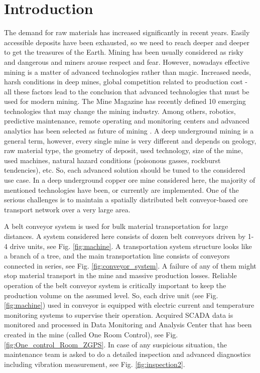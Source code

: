 \documentclass[3p,times,12pt]{elsarticle}
\begin{document}
\section{Introduction}
The demand for raw materials has increased significantly in recent years. Easily accessible deposits have been exhausted, so we need to reach deeper and deeper to get the treasures of the Earth. Mining has been usually considered as risky and dangerous and miners arouse respect and fear. However, nowadays effective mining is a matter of advanced technologies rather than magic. Increased needs, harsh conditions in deep mines, global competition related to production cost - all these factors lead to the conclusion that advanced technologies that must be used for modern mining. 
The Mine Magazine has recently defined 10 emerging technologies that may change the mining industry. Among others, robotics, predictive maintenance, remote operating and monitoring centers and advanced analytics has been selected as future of mining \cite{miningmagazine}. A deep underground mining is a general term, however, every single mine is very different and depends on geology, raw material type, the geometry of deposit, used technology, size of the mine, used machines, natural hazard conditions (poisonous gasses, rockburst tendencies), etc. So, each advanced solution should be tuned to the considered use case. In a deep underground copper ore mine considered here, the majority of mentioned technologies have been, or currently are implemented. One of the serious challenges is to maintain a spatially distributed belt conveyor-based ore transport network over a very large area.

A belt conveyor system is used for bulk material transportation for large distances. A  system considered here consists of dozen belt conveyors driven by 1-4 drive units, see Fig. \ref{fig:machine}. A transportation system structure looks like a branch of a tree, and the main transportation line consists of conveyors connected in series, see Fig. \ref{fig:conveyor_system}. A failure of any of them might stop material transport in the mine and massive production losses. Reliable operation of the belt conveyor system is critically important to keep the production volume on the assumed level. So, each drive unit (see Fig. \ref{fig:machine}) used in conveyor is equipped with electric current and temperature monitoring systems to supervise their operation. Acquired SCADA data is monitored and processed in Data Monitoring and Analysis Center that has been created in the mine (called One Room Control), see Fig. \ref{fig:One_control_Room_ZGPS}. In case of any suspicious situation, the maintenance team is asked to do a detailed inspection and advanced diagnostics including vibration measurement, see Fig. \ref{fig:inspection2}.
\end{document}
